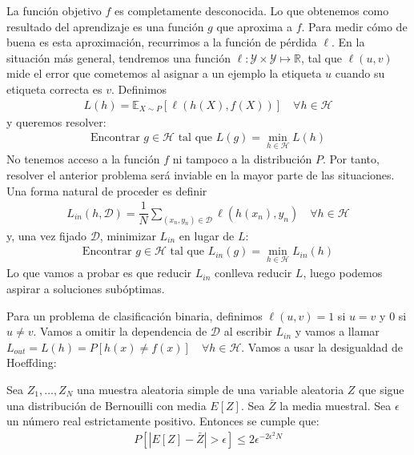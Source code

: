 La función objetivo $f$ es completamente desconocida. Lo que obtenemos como resultado del aprendizaje es una función $g$ que aproxima a $f$. Para medir cómo de buena es esta aproximación, recurrimos a la función de pérdida $\ell$.
En la situación más general, tendremos una función $\ell: \mathcal{Y} \times \mathcal{Y} \mapsto \mathbb{R}$, tal que $\ell(u, v)$ mide el error que cometemos al asignar a un ejemplo la etiqueta $u$ cuando su etiqueta correcta es $v$. Definimos 
\begin{gather*}
	L(h) = \mathbb{E}_{X \sim P}[\ell(h(X), f(X))] \quad \forall h \in \mathcal{H}
\end{gather*}
y queremos resolver:
\begin{gather*}
	\text{Encontrar $g \in \mathcal{H}$ tal que } L(g) = \min_{h \in \mathcal{H}} L(h)
\end{gather*}
No tenemos acceso a la función $f$ ni tampoco a la distribución $P$. Por tanto, resolver el anterior problema será inviable en la mayor parte de las situaciones. Una forma natural de proceder es definir 
\begin{gather*}
	L_{in}(h, \mathcal{D}) =  \dfrac{1}{N}\sum_{(x_n, y_n) \in \mathcal{D}} \ell(h(x_n), y_n) \quad  \forall h \in \mathcal{H}
\end{gather*}
y, una vez fijado $\mathcal{D}$, minimizar $L_{in}$ en lugar de $L$:
\begin{gather*}
	\text{Encontrar $g \in \mathcal{H}$ tal que } L_{in}(g) = \min_{h \in \mathcal{H}} L_{in}(h)
\end{gather*}
Lo que vamos a probar es que reducir $L_{in}$ conlleva reducir $L$, luego podemos aspirar a soluciones subóptimas.

Para un problema de clasificación binaria, definimos $\ell(u,v)=1$ si $u=v$ y $0$ si $u\neq v$. Vamos a omitir la dependencia de $\mathcal{D}$ al escribir $L_{in}$ y vamos a llamar $L_{out} = L(h) = P[h(x) \neq f(x)] \quad \forall h \in \mathcal{H}$. Vamos a usar la desigualdad de Hoeffding:

\begin{lemma}\label{hoeffding}
	Sea $Z_1, \ldots, Z_N$ una muestra aleatoria simple de una variable aleatoria $Z$ que sigue una distribución de Bernouilli con media $E[Z]$. Sea $\bar{Z}$ la media muestral. Sea $\epsilon$ un número real estrictamente positivo. Entonces se cumple que:
	\begin{align}
		P[ |E[Z] - \bar{Z}| > \epsilon  ] \leq 2 \epsilon^{-2 \epsilon^2 N}
	\end{align}
\end{lemma}

